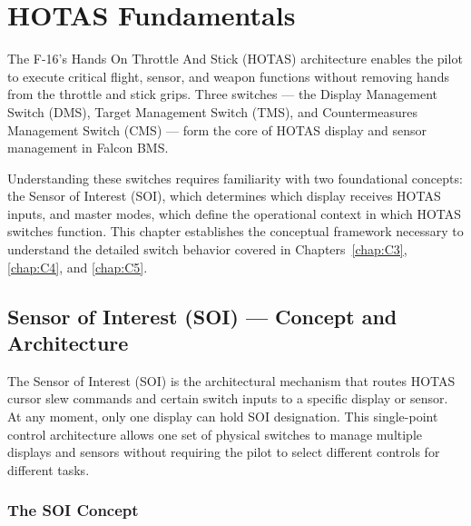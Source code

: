 \documentclass[11pt, a4paper, twoside]{report}
\begin{document}
\chapter{HOTAS Fundamentals}
\label{chap:C2}

The F-16's Hands On Throttle And Stick (HOTAS) architecture enables the pilot to execute critical flight, sensor, and weapon functions without removing hands from the throttle and stick grips. Three switches — the Display Management Switch (DMS), Target Management Switch (TMS), and Countermeasures Management Switch (CMS) — form the core of HOTAS display and sensor management in Falcon BMS.

Understanding these switches requires familiarity with two foundational concepts: the Sensor of Interest (SOI), which determines which display receives HOTAS inputs, and master modes, which define the operational context in which HOTAS switches function. This chapter establishes the conceptual framework necessary to understand the detailed switch behavior covered in Chapters~\ref{chap:C3}, \ref{chap:C4}, and \ref{chap:C5}.


\section{Sensor of Interest (SOI) — Concept and Architecture}
\label{sec:C2-S1}

The Sensor of Interest (SOI) is the architectural mechanism that routes HOTAS cursor slew commands and certain switch inputs to a specific display or sensor. At any moment, only one display can hold SOI designation. This single-point control architecture allows one set of physical switches to manage multiple displays and sensors without requiring the pilot to select different controls for different tasks.


\subsection{The SOI Concept}
\label{sec:C2-S1-S1}
\end{document}
